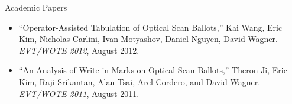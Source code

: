 \documentclass{resume}
\begin{document}
\begin{component}{Academic Papers}
\begin{itemize}
\vspace{-0.5em}
        \item[] ``Operator-Assisted Tabulation of Optical Scan Ballots,'' Kai Wang, Eric Kim, Nicholas Carlini, Ivan Motyashov, Daniel Nguyen, David Wagner. \emph{EVT/WOTE 2012}, August 2012.
\vspace{-0.5em}
		\item[] ``An Analysis of Write-in Marks on Optical Scan Ballots,'' Theron Ji, Eric Kim, Raji Srikantan, Alan Tsai, Arel Cordero, and David Wagner. \emph{EVT/WOTE 2011}, August 2011.
\vspace{-0.5em}
	\end{itemize}
\end{component}


\end{document}
